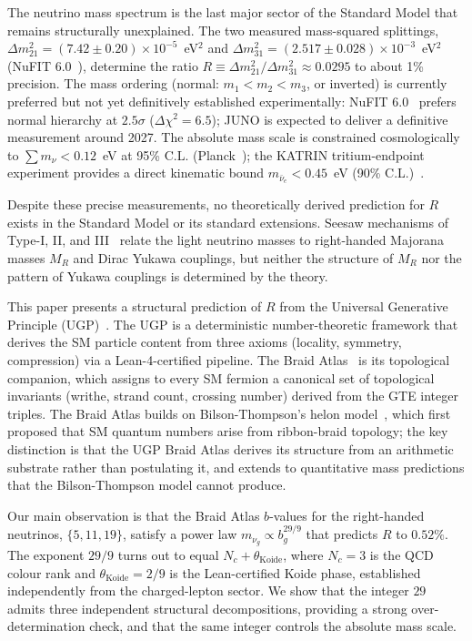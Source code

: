 \documentclass[12pt,a4paper]{article}
\theoremstyle{definition}
\theoremstyle{remark}
\begin{document}
The neutrino mass spectrum is the last major sector of the Standard Model
that remains structurally unexplained.
The two measured mass-squared splittings,
$\Delta m^2_{21} = (7.42 \pm 0.20) \times 10^{-5}$~eV$^2$ and
$\Delta m^2_{31} = (2.517 \pm 0.028) \times 10^{-3}$~eV$^2$
(NuFIT 6.0~\cite{NuFIT60}),
determine the ratio $R \equiv \Delta m^2_{21}/\Delta m^2_{31} \approx 0.0295$
to about 1\% precision.
The mass ordering (normal: $m_1 < m_2 < m_3$, or inverted) is currently preferred but not yet
definitively established experimentally: NuFIT 6.0~\cite{NuFIT60} prefers normal hierarchy at $2.5\sigma$ ($\Delta\chi^2 = 6.5$); JUNO is expected to deliver a definitive measurement around 2027.
The absolute mass scale is constrained cosmologically to
$\sum m_\nu < 0.12$~eV at 95\% C.L. (Planck~\cite{Planck2018}); the
KATRIN tritium-endpoint experiment provides a direct kinematic bound
$m_{\bar\nu_e} < 0.45$~eV (90\% C.L.)~\cite{KATRIN2024}.

Despite these precise measurements, no theoretically derived prediction
for $R$ exists in the Standard Model or its standard extensions.
Seesaw mechanisms of Type-I, II, and III~\cite{Minkowski1977,Yanagida1979,GellMann1979}
relate the light neutrino masses to right-handed Majorana masses
$M_R$ and Dirac Yukawa couplings, but neither the structure of $M_R$
nor the pattern of Yukawa couplings is determined by the theory.

This paper presents a structural prediction of $R$ from the
Universal Generative Principle (UGP)~\cite{Spivack2026_SM_UGP,SpivackUGPFormalization}.
The UGP is a deterministic number-theoretic framework that derives the
SM particle content from three axioms (locality, symmetry, compression)
via a Lean-4-certified pipeline.
The Braid Atlas~\cite{SpivackBraidAtlas} is its topological companion,
which assigns to every SM fermion a canonical set of topological
invariants (writhe, strand count, crossing number) derived from the
GTE integer triples.
The Braid Atlas builds on Bilson-Thompson's helon model~\cite{bilson-thompson2006,BilsonThompsonMarkopoulouSmolin2007}, which first proposed that SM quantum numbers arise from ribbon-braid topology; the key distinction is that the UGP Braid Atlas derives its structure from an arithmetic substrate rather than postulating it, and extends to quantitative mass predictions that the Bilson-Thompson model cannot produce.

Our main observation is that the Braid Atlas $b$-values for the
right-handed neutrinos, $\{5, 11, 19\}$,
satisfy a power law $m_{\nu_g} \propto b_g^{29/9}$
that predicts $R$ to $0.52\%$.
The exponent $29/9$ turns out to equal $N_c + \theta_{\mathrm{Koide}}$,
where $N_c = 3$ is the QCD colour rank and $\theta_{\mathrm{Koide}} = 2/9$
is the Lean-certified Koide phase, established independently from
the charged-lepton sector.
We show that the integer $29$ admits three independent structural
decompositions, providing a strong over-determination check,
and that the same integer controls the absolute mass scale.
\end{document}
